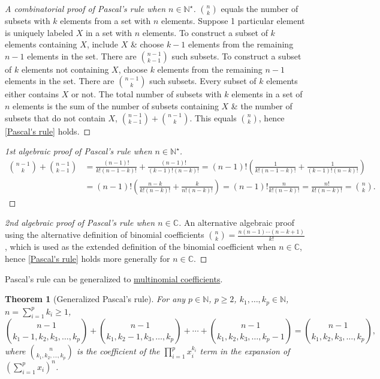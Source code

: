 \documentclass{article}
\newtheorem{theorem}{Theorem}
\begin{document}
\begin{proof}[A combinatorial proof of Pascal's rule when $n\in\mathbb{N}^\star$]
	$\binom{n}{k}$ equals the number of subsets with $k$ elements from a set with $n$ elements. Suppose 1 particular element is uniquely labeled $X$ in a set with $n$ elements. To construct a subset of $k$ elements containing $X$, include $X$ \& choose $k - 1$ elements from the remaining $n - 1$ elements in the set. There are $\binom{n - 1}{k - 1}$ such subsets. To construct a subset of $k$ elements not containing $X$, choose $k$ elements from the remaining $n - 1$ elements in the set. There are $\binom{n - 1}{k}$ such subsets. Every subset of $k$ elements either contains $X$ or not. The total number of subsets with $k$ elements in a set of $n$ elements is the sum of the number of subsets containing $X$ \& the number of subsets that do not contain $X$, $\binom{n - 1}{k - 1} + \binom{n - 1}{k}$. This equals $\binom{n}{k}$, hence \eqref{Pascal's rule} holds.
\end{proof}

\begin{proof}[1st algebraic proof of Pascal's rule when $n\in\mathbb{N}^\star$]
	\begin{align*}
		\binom{n - 1}{k} + \binom{n - 1}{k - 1} &= \frac{(n - 1)!}{k!(n - 1 - k)!} + \frac{(n - 1)!}{(k - 1)!(n - k)!} = (n - 1)!\left(\frac{1}{k!(n - 1 - k)!} + \frac{1}{(k - 1)!(n - k)!}\right)\\
		&= (n - 1)!\left(\frac{n - k}{k!(n - k)!} + \frac{k}{n!(n - k)!}\right) = (n - 1)!\frac{n}{k!(n - k)!} = \frac{n!}{k!(n - k)!} = \binom{n}{k}.
	\end{align*}
\end{proof}

\begin{proof}[2nd algebraic proof of Pascal's rule when $n\in\mathbb{C}$]
	An alternative algebraic proof using the alternative definition of binomial coefficients $\binom{n}{k} = \frac{n(n - 1)\cdots(n - k + 1)}{k!}$, which is used as the extended definition of the binomial coefficient when $n\in\mathbb{C}$, hence \eqref{Pascal's rule} holds more generally for $n\in\mathbb{C}$.
\end{proof}
Pascal's rule can be generalized to \href{https://en.wikipedia.org/wiki/Multinomial_coefficient}{multinomial coefficients}.

\begin{theorem}[Generalized Pascal's rule]
	For any $p\in\mathbb{N}$, $p\ge2$, $k_1,\ldots,k_p\in\mathbb{N}$, $n = \sum_{i=1}^p k_i\ge1$,
	\begin{equation}
		\label{generalized Pascal's rule}
		\tag{gPasr}
		\binom{n - 1}{k_1 - 1,k_2,k_3,\ldots,k_p} + \binom{n - 1}{k_1,k_2 - 1,k_3,\ldots,k_p} + \cdots + \binom{n - 1}{k_1,k_2,k_3,\ldots,k_p - 1} = \binom{n - 1}{k_1,k_2,k_3,\ldots,k_p},
	\end{equation}
	where $\binom{n}{k_1,k_2,\ldots,k_p}$ is the coefficient of the $\prod_{i=1}^p x_i^{k_i}$ term in the expansion of $\left(\sum_{i=1}^p x_i\right)^n$.
\end{theorem}
\end{document}
